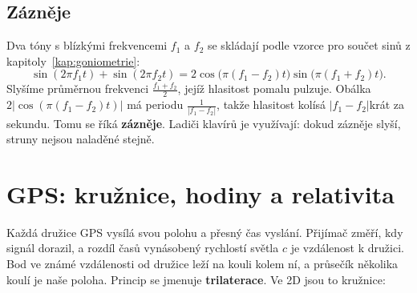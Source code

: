 \subsection{Zázněje}

Dva tóny s blízkými frekvencemi $f_1$ a $f_2$ se skládají podle vzorce pro součet sinů z kapitoly~\ref{kap:goniometrie}:
\begin{equation*}
  \sin(2\pi f_1t) + \sin(2\pi f_2t) = 2\cos\big(\pi(f_1 - f_2)t\big)\sin\big(\pi(f_1 + f_2)t\big).
\end{equation*}
Slyšíme průměrnou frekvenci $\frac{f_1 + f_2}{2}$, jejíž hlasitost pomalu pulzuje. Obálka $2|\cos(\pi(f_1 - f_2)t)|$ má periodu $\frac{1}{|f_1 - f_2|}$, takže hlasitost kolísá $|f_1 - f_2|$krát za sekundu. Tomu se říká \textbf{zázněje}. Ladiči klavírů je využívají: dokud zázněje slyší, struny nejsou naladěné stejně.

\begin{center}
\end{center}

\section{GPS: kružnice, hodiny a relativita}

Každá družice GPS vysílá svou polohu a přesný čas vyslání. Přijímač změří, kdy signál dorazil, a rozdíl časů vynásobený rychlostí světla $c$ je vzdálenost k družici. Bod ve známé vzdálenosti od družice leží na kouli kolem ní, a průsečík několika koulí je naše poloha. Princip se jmenuje \textbf{trilaterace}. Ve 2D jsou to kružnice:

